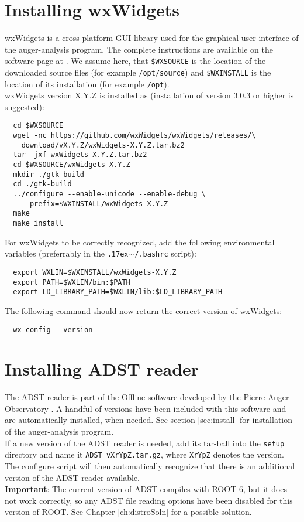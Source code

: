 \documentclass[12pt,a4paper]{report}
\newcommand{\mytilde}{\raise.17ex\hbox{$\scriptstyle\mathtt{\sim}$}}		%
\begin{document}
\section{Installing wxWidgets}
wxWidgets is a cross-platform GUI library used for the graphical user interface of the auger-analysis program. The complete instructions are available on the software page at \cite{wxWidgets}. We assume here, that \texttt{\$WXSOURCE} is the location of the downloaded source files (for example \texttt{/opt/source}) and \texttt{\$WXINSTALL} is the location of its installation (for example \texttt{/opt}).\\
wxWidgets version X.Y.Z is installed as (installation of version 3.0.3 or higher is suggested):
\footnotesize
\begin{verbatim}
  cd $WXSOURCE
  wget -nc https://github.com/wxWidgets/wxWidgets/releases/\
    download/vX.Y.Z/wxWidgets-X.Y.Z.tar.bz2
  tar -jxf wxWidgets-X.Y.Z.tar.bz2
  cd $WXSOURCE/wxWidgets-X.Y.Z
  mkdir ./gtk-build
  cd ./gtk-build
  ../configure --enable-unicode --enable-debug \
    --prefix=$WXINSTALL/wxWidgets-X.Y.Z
  make
  make install
\end{verbatim}
\normalsize
For wxWidgets to be correctly recognized, add the following environmental variables (preferrably in the \texttt{\mytilde/.bashrc} script):
\footnotesize
\begin{verbatim}
  export WXLIN=$WXINSTALL/wxWidgets-X.Y.Z
  export PATH=$WXLIN/bin:$PATH
  export LD_LIBRARY_PATH=$WXLIN/lib:$LD_LIBRARY_PATH
\end{verbatim}
\normalsize
The following command should now return the correct version of wxWidgets:
\footnotesize
\begin{verbatim}
  wx-config --version
\end{verbatim}
\normalsize

\section{Installing ADST reader}
The ADST reader is part of the Offline software developed by the Pierre Auger Observatory \cite{offline}. A handful of versions have been included with this software and are automatically installed, when needed. See section \ref{sec:install} for installation of the auger-analysis program.\\
If a new version of the ADST reader is needed, add its tar-ball into the \texttt{setup} directory and name it \texttt{ADST\_vXrYpZ.tar.gz}, where \texttt{XrYpZ} denotes the version. The configure script will then automatically recognize that there is an additional version of the ADST reader available.\\
\textbf{Important}: The current version of ADST compiles with ROOT 6, but it does not work correctly, so any ADST file reading options have been disabled for this version of ROOT. See Chapter \ref{ch:distroSoln} for a possible solution.
\end{document}
